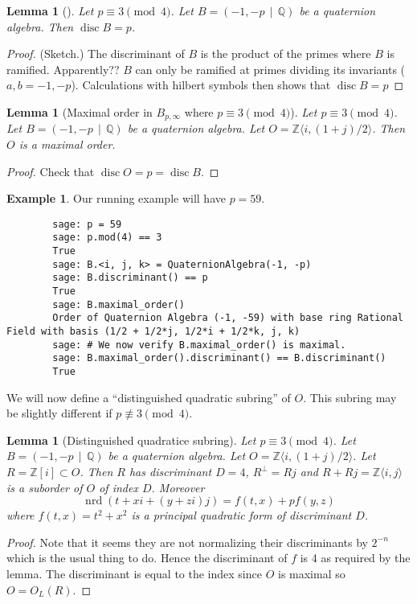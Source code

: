 \documentclass[10pt]{article}
\theoremstyle{plain}
\newtheorem{lemma}[theorem]{Lemma}
\theoremstyle{definition}
\newtheorem{example}[theorem]{Example}
\newcommand{\op}{\operatorname}
\newcommand{\Z}{\mathbb{Z}}
\newcommand{\Q}{\mathbb{Q}}
\newcommand{\nrd}{\op{nrd}}
\newcommand{\disc}{\op{disc}}
\begin{document}
\begin{lemma}[]
    Let \( p \equiv 3 \pmod{4} \).
    Let \( B =  (-1, -p \, \mid \, \Q) \) be a quaternion algebra.
    Then \( \disc B = p \).
\end{lemma}
\begin{proof}
    (Sketch.)
    The discriminant of \( B \) is the product of the primes where \( B \) is ramified.
    Apparently?? \( B \) can only be ramified at primes dividing its invariants (\( a, b = -1, -p\)).
    Calculations with hilbert symbols then shows that \( \disc B = p \)
\end{proof}

\begin{lemma}[Maximal order in \( B_{p, \infty} \) where \( p \equiv 3 \pmod{4} \)]
    Let \( p \equiv 3 \pmod{4} \).
    Let \( B =  (-1, -p \, \mid \, \Q) \) be a quaternion algebra.
    Let \( O = \Z \langle i, (1+j) / 2 \rangle \).
    Then \( O \) is a maximal order.
\end{lemma}
\begin{proof}
    Check that \( \disc O  = p = \disc B\).
\end{proof}

\begin{example}
    Our running example will have \( p = 59 \).
    \begin{lstlisting}
        sage: p = 59
        sage: p.mod(4) == 3
        True 
        sage: B.<i, j, k> = QuaternionAlgebra(-1, -p)
        sage: B.discriminant() == p
        True
        sage: B.maximal_order()
        Order of Quaternion Algebra (-1, -59) with base ring Rational Field with basis (1/2 + 1/2*j, 1/2*i + 1/2*k, j, k)
        sage: # We now verify B.maximal_order() is maximal.
        sage: B.maximal_order().discriminant() == B.discriminant()
        True
    \end{lstlisting}
\end{example}

We will now define a ``distinguished quadratic subring'' of \( O \).
This subring may be slightly different if \( p \not\equiv 3 \pmod{4} \).

\begin{lemma}[Distinguished quadratice subring]
    Let \( p \equiv 3 \pmod{4} \).
    Let \( B =  (-1, -p \, \mid \, \Q) \) be a quaternion algebra.
    Let \( O = \Z \langle i, (1+j) / 2 \rangle \).
    Let \( R = \Z[i] \subset O \).
    Then \( R \) has discriminant \( D = 4 \), \( R^\perp = Rj \) and \( R + Rj = \Z\langle i, j \rangle\) is a suborder of \( O \) of index \( D \).
    Moreover
    \[
        \nrd(t + xi + (y + zi)j) = f(t, x) + p f(y, z)
    \]
    where \( f(t, x) = t^2 + x^2 \) is a principal quadratic form of discriminant \( D \).
\end{lemma}
\begin{proof}
    Note that it seems they are not normalizing their discriminants by \( 2^{-n} \) which is the usual thing to do.
    Hence the discriminant of \( f \) is 4 as required by the lemma.
    The discriminant is equal to the index since \( O \) is maximal so \( O = O_L(R) \).
\end{proof}
\end{document}
